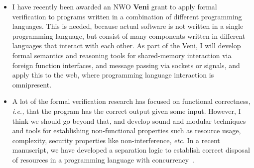 \documentclass[sigplan]{acmart}
\newcommand{\ie}{\textit{i.e.,}\xspace}
\newcommand{\etc}{\textit{etc.}\xspace}
\begin{document}
\begin{itemize}
\item I have recently been awarded an NWO \textbf{Veni} grant to apply formal
  verification to programs written in a combination of different programming languages.
  This is needed, because actual software is not written in a single programming
  language, but consist of many components written in different languages that
  interact with each other.
  As part of the Veni, I will develop formal semantics and reasoning tools
  for shared-memory interaction via foreign function interfaces,
  and message passing via sockets or signals, and apply this to the web,
  where programming language interaction is omnipresent.
\item A lot of the formal verification research has focused on functional
  correctness, \ie that the program has the correct output given some input.
  However, I think we should go beyond that, and develop sound and modular
  techniques and tools for establishing non-functional properties such as
  resource usage, complexity, security properties like non-interference, \etc
  In a recent manuscript, we have developed a separation logic to establish correct
  disposal of resources in a programming language with concurrency~\cite{iron}.
\end{itemize}



\end{document}
